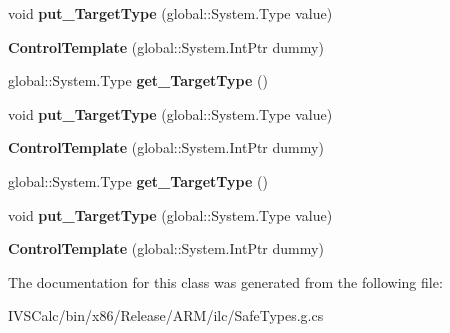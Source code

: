 \begin{DoxyCompactItemize}
\item 
\mbox{\label{class_windows_1_1_u_i_1_1_xaml_1_1_controls_1_1_control_template_a405f3df62bb5a6d75bcf54d3f6474116}} 
void {\bfseries put\+\_\+\+Target\+Type} (global\+::\+System.\+Type value)
\item 
\mbox{\label{class_windows_1_1_u_i_1_1_xaml_1_1_controls_1_1_control_template_a9aec924d7ed27f4159fada95351e7b18}} 
{\bfseries Control\+Template} (global\+::\+System.\+Int\+Ptr dummy)
\item 
\mbox{\label{class_windows_1_1_u_i_1_1_xaml_1_1_controls_1_1_control_template_a42407fa2d0de390bb92e774494459d1d}} 
global\+::\+System.\+Type {\bfseries get\+\_\+\+Target\+Type} ()
\item 
\mbox{\label{class_windows_1_1_u_i_1_1_xaml_1_1_controls_1_1_control_template_a405f3df62bb5a6d75bcf54d3f6474116}} 
void {\bfseries put\+\_\+\+Target\+Type} (global\+::\+System.\+Type value)
\item 
\mbox{\label{class_windows_1_1_u_i_1_1_xaml_1_1_controls_1_1_control_template_a9aec924d7ed27f4159fada95351e7b18}} 
{\bfseries Control\+Template} (global\+::\+System.\+Int\+Ptr dummy)
\item 
\mbox{\label{class_windows_1_1_u_i_1_1_xaml_1_1_controls_1_1_control_template_a42407fa2d0de390bb92e774494459d1d}} 
global\+::\+System.\+Type {\bfseries get\+\_\+\+Target\+Type} ()
\item 
\mbox{\label{class_windows_1_1_u_i_1_1_xaml_1_1_controls_1_1_control_template_a405f3df62bb5a6d75bcf54d3f6474116}} 
void {\bfseries put\+\_\+\+Target\+Type} (global\+::\+System.\+Type value)
\item 
\mbox{\label{class_windows_1_1_u_i_1_1_xaml_1_1_controls_1_1_control_template_a9aec924d7ed27f4159fada95351e7b18}} 
{\bfseries Control\+Template} (global\+::\+System.\+Int\+Ptr dummy)
\end{DoxyCompactItemize}


The documentation for this class was generated from the following file\+:\begin{DoxyCompactItemize}
\item 
I\+V\+S\+Calc/bin/x86/\+Release/\+A\+R\+M/ilc/Safe\+Types.\+g.\+cs\end{DoxyCompactItemize}
